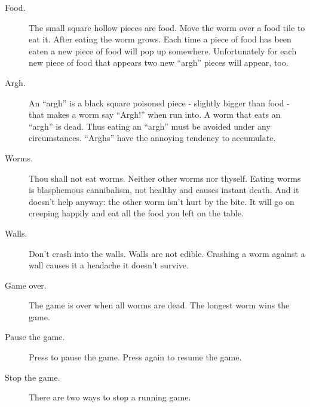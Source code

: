 \begin{description}
\item[Food.]
The small square hollow pieces are food. Move the worm over a food tile
to eat it. After eating the worm grows. Each time a piece of food has
been eaten a new piece of food will pop up somewhere. Unfortunately for
each new piece of food that appears two new ``argh'' pieces will
appear, too.
\item[Argh.]
An ``argh'' is a black square poisoned piece {}- slightly bigger than
food {}- that makes a worm say ``Argh!'' when
run into.  A worm that eats an ``argh'' is dead. Thus eating an
``argh'' must be avoided under any circumstances. ``Arghs'' have the
annoying tendency to accumulate. 
\item[Worms.]
Thou shall not eat worms. Neither other worms nor thyself. Eating worms
is blasphemous cannibalism, not healthy and causes instant
death. And it doesn't help anyway: the other worm
isn't hurt by the bite. It will go on creeping happily
and eat all the food you left on the table. 
\item[Walls.]
Don't crash into the walls. Walls are not edible.
Crashing a worm against a wall causes it a headache it
doesn't survive. 
\item[Game over.]
The game is over when all worms are dead. The longest worm wins the
game. 
\item [Pause the game.]
Press
%
%
to pause the game. Press
%
%
again to resume the game.

\item[Stop the game.]
There are two ways to stop a running game.


\end{description}
